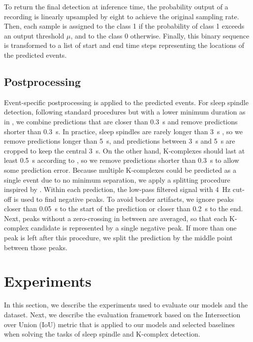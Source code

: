 \documentclass[conference]{IEEEtran}
\begin{document}
To return the final detection at inference time, the probability output of a recording is linearly upsampled by eight to achieve the original sampling rate. Then, each sample is assigned to the class 1 if the probability of class 1 exceeds an output threshold $\mu$, and to the class 0 otherwise. Finally, this binary sequence is transformed to a list of start and end time steps representing the locations of the predicted events.

\subsection{Postprocessing}
\label{sec:postprocessing}

Event-specific postprocessing is applied to the predicted events. For sleep spindle detection, following standard procedures \cite{berry2012aasm} but with a lower minimum duration as in \cite{warby2014sleep}, we combine predictions that are closer than 0.3~s and remove predictions shorter than 0.3~s. In practice, sleep spindles are rarely longer than 3~s \cite{warby2014sleep}, so we remove predictions longer than 5~s, and predictions between 3~s and 5~s are cropped to keep the central 3~s. On the other hand, K-complexes should last at least 0.5~s according to \cite{berry2012aasm}, so we remove predictions shorter than 0.3~s to allow some prediction error. Because multiple K-complexes could be predicted as a single event due to no minimum separation, we apply a splitting procedure inspired by \cite{lajnef2017meet}. Within each prediction, the low-pass filtered signal with 4~Hz cut-off is used to find negative peaks. To avoid border artifacts, we ignore peaks closer than 0.05~s to the start of the prediction or closer than 0.2~s to the end. Next, peaks without a zero-crossing in between are averaged, so that each K-complex candidate is represented by a single negative peak. If more than one peak is left after this procedure, we split the prediction by the middle point between those peaks.



\section{Experiments}
In this section, we describe the experiments used to evaluate our models and the dataset. Next, we describe the evaluation framework based on the Intersection over Union (IoU) metric that is applied to our models and selected baselines when solving the tasks of sleep spindle and K-complex detection.
\end{document}
